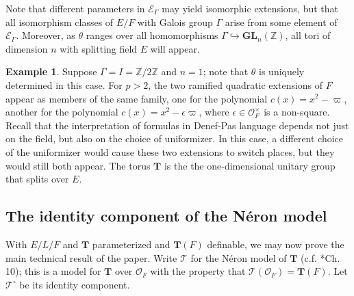\documentclass{amsart}
\newcommand{\Z}{{\mathbb Z}}
\newcommand{\ri}{\mathcal{O}}
\newcommand{\GL}{\mathbf {GL}}
\newcommand{\bT}{\mathbf {T}}
\newcommand\cE{{\mathcal E}}
\newcommand{\Ner}[1]{\mathcal{#1}}
\newcommand{\NerC}[1]{\mathcal{#1}^\circ}
\theoremstyle{plain}
\theoremstyle{definition}
\newtheorem{rem}[thm]{Remark}
\newtheorem{example}[thm]{Example}
\begin{document}
Note that different parameters in $\cE_\Gamma$ may yield isomorphic extensions, but that all isomorphism classes of $E/F$ with Galois group $\Gamma$
arise from some element of $\cE_\Gamma$.  Moreover, as $\theta$ ranges over all homomorphisms $\Gamma \hookrightarrow \GL_n(\Z)$, all tori of dimension $n$ with splitting field $E$ will appear.
\begin{example}
Suppose $\Gamma = I = \Z / 2\Z$ and $n=1$; note that $\theta$ is uniquely determined in this case.
For $p > 2$, the two ramified quadratic extensions of $F$ appear as members of the same family,
one for the polynomial $c(x) = x^2-\varpi$, another for the polynomial $c(x) = x^2-\epsilon\varpi$,
where $\epsilon \in \ri_F^\times$ is a non-square.
Recall that the interpretation of formulas in Denef-Pas language depends not just on the field,
but also on the choice of uniformizer. In this case, a different choice of the uniformizer
would cause these two extensions to switch places, but they would still both appear.
The torus $\bT$ is the the one-dimensional unitary group that splits over $E$.
\end{example}

\subsection{The identity component of the N\'eron model} \label{sub:NerCdefinable}

With $E/L/F$ and $\bT$ parameterized and $\bT(F)$ definable, we may now prove the main technical result of the paper.
Write $\Ner{T}$ for the N\'eron model of $\bT$ (c.f. \cite{bosch-lutkebohmert-raynaud:neron}*{Ch. 10}); this is a model for $\bT$ over $\ri_F$ with the property that $\Ner{T}(\ri_F) = \bT(F)$.  Let $\NerC{T}$ be its identity component.
\end{document}
